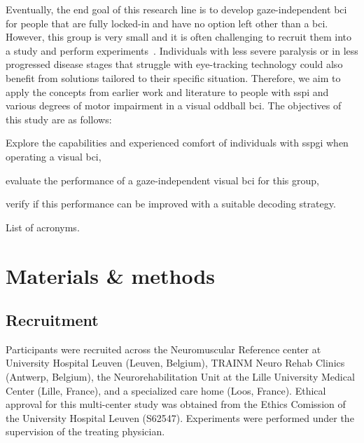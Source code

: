 \documentclass[twocolumn]{article}
\begin{document}
Eventually, the end goal of this research line is to develop
gaze-independent \ac{bci} for people that are fully locked-in and have no option
left other than a \ac{bci}.
However, this group is very small and it is often challenging to recruit them
into a study and perform experiments~\cite{Wolpaw2006}.
Individuals with less severe paralysis or in less progressed disease stages that struggle with
eye-tracking technology could also benefit from
solutions tailored to their specific situation.
Therefore, we aim to apply the concepts from earlier work and literature to
people with \ac{sspi} and various degrees of motor impairment in a visual oddball
\ac{bci}.
The objectives of this study are as follows:
\begin{enumerate*}
  \item Explore the capabilities and experienced comfort of individuals with
    \ac{sspgi} when operating a visual \ac{bci},
  \item evaluate the performance of a gaze-independent visual \ac{bci} for this
    group,
  \item verify if this performance can be improved with a suitable decoding
    strategy.
\end{enumerate*}

\begin{table}
  \footnotesize
  \printacronyms[template=tabular, heading=none]
  \caption{List of acronyms.}
\end{table}


\section{Materials \& methods}
\subsection{Recruitment}
Participants were recruited across the Neuromuscular Reference center at
University Hospital Leuven (Leuven, Belgium), TRAINM Neuro Rehab Clinics
(Antwerp, Belgium), the Neurorehabilitation Unit at the Lille University
Medical Center (Lille, France), and a specialized care home (Loos,
France).
Ethical approval for this multi-center study was obtained from the Ethics
Comission of the University Hospital Leuven (S62547).
Experiments were performed under the supervision of the treating physician.
\end{document}
